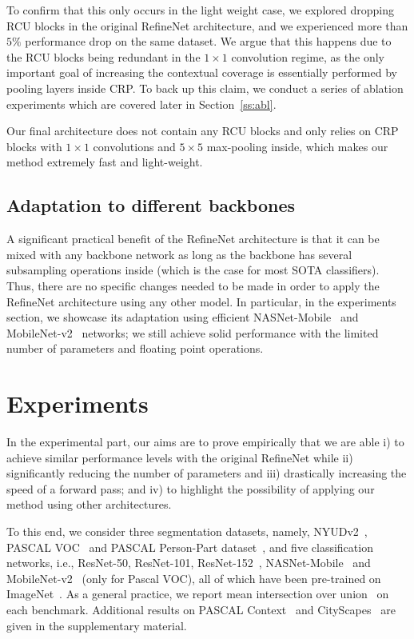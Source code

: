 \documentclass{bmvc2k}
\begin{document}
To confirm that this only occurs in the light weight case, we explored dropping RCU blocks in the original RefineNet architecture, and we experienced more than $5\%$ performance drop on the same dataset. We argue that this happens due to the RCU blocks being redundant in the $1\times1$ convolution regime, as the only important goal of increasing the contextual coverage is essentially performed by pooling layers inside CRP. To back up this claim, we conduct a series of ablation experiments which are covered later in Section~\ref{ss:abl}.

Our final architecture does not contain any RCU blocks and only relies on CRP blocks with $1\times1$ convolutions and $5\times5$ max-pooling inside, which makes our method extremely fast and light-weight.
    
\subsection{Adaptation to different backbones}
\label{ss:ada}
A significant practical benefit of the RefineNet architecture is that it can be mixed with any backbone network as long as the backbone has several subsampling operations inside (which is the case for most SOTA classifiers). Thus, there are no specific changes needed to be made in order to apply the RefineNet architecture using any other model. In particular, in the experiments section, we showcase its adaptation using efficient NASNet-Mobile~\cite{ZophVSL17} and MobileNet-v2~\cite{abs-1801-04381} networks; we still achieve solid performance with the limited number of parameters and floating point operations.
	




\section{Experiments}
In the experimental part, our aims are to prove empirically that we are able i) to achieve similar performance levels with the original RefineNet while ii) significantly reducing the number of parameters and iii) drastically increasing the speed of a forward pass; and iv) to highlight the possibility of applying our method using other architectures.

To this end, we consider three segmentation datasets, namely, NYUDv2~\cite{SilbermanHKF12}, PASCAL VOC~\cite{EveringhamGWWZ10} and PASCAL Person-Part dataset~\cite{ChenMLFUY14,ChenYWXY16}, and five classification networks, i.e., ResNet-50, ResNet-101, ResNet-152~\cite{HeZRS16}, NASNet-Mobile~\cite{ZophVSL17} and MobileNet-v2~\cite{abs-1801-04381} (only for Pascal VOC), all of which have been pre-trained on ImageNet~\cite{DengDSLL009}. As a general practice, we report mean intersection over union~\cite{EveringhamGWWZ10} on each benchmark. Additional results on PASCAL Context~\cite{MottaghiCLCLFUY14} and CityScapes~\cite{CordtsORREBFRS16} are given in the supplementary material.
	
\end{document}
